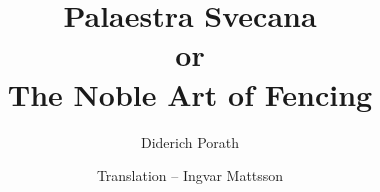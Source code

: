 \documentclass[a4paper]{book}
\begin{document}
\title{Palaestra Svecana \\ or \\ \Large{The Noble Art of Fencing} }
\author{Diderich Porath}
\author{Translation -- Ingvar Mattsson}

\maketitle






\end{document}
